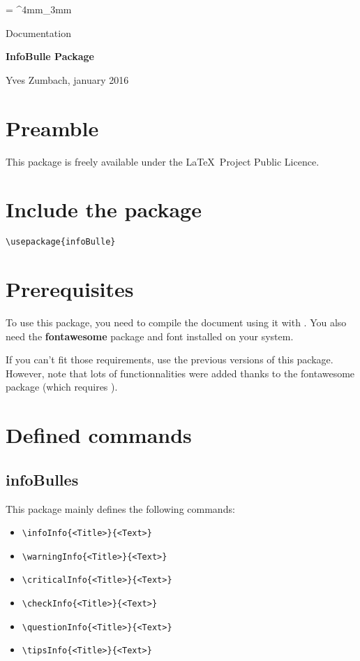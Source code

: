 \documentclass[a4paper, 11pt, oneside, fleqn]{article}
\newcommand{\inColor}[1]{{\bfseries\color{mainColor}#1}}
\newcommand{\myTitle}{\inColor{\fontsize{1.3cm}{1em}\selectfont InfoBulle Package}}
\begin{document}
\everyrow{\tabucline[.4mm  white]{}}
\tabulinesep = ^4mm_3mm


\hfill
\begin{minipage}{\widthof{\myTitle}}
	{\fontsize{.6cm}{1em}\selectfont\color{mainColor}
		Documentation
	}
	\begin{spacing}{3}
		\myTitle
	\end{spacing}
	\vspace*{-10mm}
	\begin{flushright}
		Yves Zumbach, january 2016
	\end{flushright}
\end{minipage}

\newpage

\section{Preamble}
This package is freely available under the \LaTeX\ Project Public Licence.

\section{Include the package}
\lstinline|\usepackage{infoBulle}|

\section{Prerequisites}
To use this package, you need to compile the document using it with \inColor{\XeLaTeX}. You also need the \inColor{fontawesome} package and font installed on your system.

If you can't fit those requirements, use the previous versions of this package. However, note that lots of functionnalities were added thanks to the fontawesome package (which requires \XeLaTeX).


\section{Defined commands}
\subsection{infoBulles}
This package mainly defines the following commands:
\begin{itemize}
	\item \verb|\infoInfo{<Title>}{<Text>}|
	\item \verb|\warningInfo{<Title>}{<Text>}|
	\item \verb|\criticalInfo{<Title>}{<Text>}|
	\item \verb|\checkInfo{<Title>}{<Text>}|
	\item \verb|\questionInfo{<Title>}{<Text>}|
	\item \verb|\tipsInfo{<Title>}{<Text>}|
\end{itemize}
\end{document}
